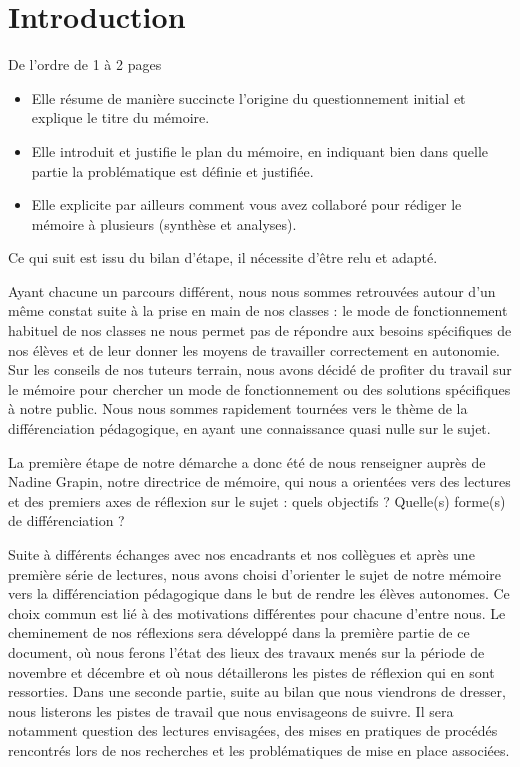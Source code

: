 \section{Introduction}
{\color{red}De l'ordre de 1 à 2 pages
\begin{itemize}
\item Elle résume de manière succincte l'origine du questionnement initial et explique le titre du mémoire.
\item Elle introduit et justifie le plan du mémoire, en indiquant bien dans quelle partie la problématique est définie et justifiée.
\item Elle explicite par ailleurs comment vous avez collaboré pour rédiger le mémoire à plusieurs (synthèse et analyses).
\end{itemize}

Ce qui suit est issu du bilan d'étape, il nécessite d'être relu et adapté.}

Ayant chacune un parcours différent, nous nous sommes retrouvées autour d’un même constat suite à la prise en main de nos classes : le mode de fonctionnement habituel de nos classes ne nous permet pas de répondre aux besoins spécifiques de nos élèves et de leur donner les moyens de travailler correctement en autonomie. Sur les conseils de nos tuteurs terrain, nous avons décidé de profiter du travail sur le mémoire pour chercher un mode de fonctionnement ou des solutions spécifiques à notre public. Nous nous sommes rapidement tournées vers le thème de la différenciation pédagogique, en ayant une connaissance quasi nulle sur le sujet.

La première étape de notre démarche a donc été de nous renseigner auprès de Nadine Grapin, notre directrice de mémoire, qui nous a orientées vers des lectures et des premiers axes de réflexion sur le sujet : quels objectifs ? Quelle(s) forme(s) de différenciation ?

Suite à différents échanges avec nos encadrants et nos collègues et après une première série de lectures, nous avons choisi d’orienter le sujet de notre mémoire vers la différenciation pédagogique dans le but de rendre les élèves autonomes. Ce choix commun est lié à des motivations différentes pour chacune d’entre nous.
Le cheminement de nos réflexions sera développé dans la première partie de ce document, où nous ferons l’état des lieux des travaux menés sur la période de novembre et décembre et où nous détaillerons les pistes de réflexion qui en sont ressorties.
Dans une seconde partie, suite au bilan que nous viendrons de dresser, nous listerons les pistes de travail que nous envisageons de suivre. Il sera notamment question des lectures envisagées, des mises en pratiques de procédés rencontrés lors de nos recherches et les problématiques de mise en place associées.

